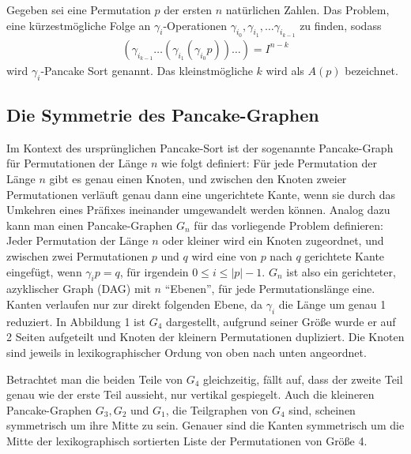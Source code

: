 \documentclass[a4paper, 10pt, ngerman]{article}
\begin{document}
\begin{definition}
    Gegeben sei eine Permutation $p$ der ersten $n$ natürlichen Zahlen. Das Problem, eine kürzestmögliche Folge an $\gamma_i$-Operationen $\gamma_{i_0}, \gamma_{i_1}, \dots \gamma_{i_{k-1}}$ zu finden, sodass
    \begin{align*}
        (\gamma_{i_{k-1}} \dots (\gamma_{i_1} (\gamma_{i_0} p)) \dots) = I^{n - k}
    \end{align*}
    wird $\gamma_i$-Pancake Sort genannt. Das kleinstmögliche $k$ wird als $A(p)$ bezeichnet.
\end{definition}

\subsection{Die Symmetrie des Pancake-Graphen}

Im Kontext des ursprünglichen Pancake-Sort ist der sogenannte Pancake-Graph für Permutationen der Länge $n$ wie folgt definiert: Für jede Permutation der Länge $n$ gibt es genau einen Knoten, und zwischen den Knoten zweier Permutationen verläuft genau dann eine ungerichtete Kante, wenn sie durch das Umkehren eines Präfixes ineinander umgewandelt werden können. Analog dazu kann man einen Pancake-Graphen $G_n$ für das vorliegende Problem definieren: Jeder Permutation der Länge $n$ oder kleiner wird ein Knoten zugeordnet, und zwischen zwei Permutationen $p$ und $q$ wird eine von $p$ nach $q$ gerichtete Kante eingefügt, wenn $\gamma_i p = q$, für irgendein $0 \le i \le |p|-1$. $G_n$ ist also ein gerichteter, azyklischer Graph (DAG) mit $n$ ``Ebenen'', für jede Permutationslänge eine. Kanten verlaufen nur zur direkt folgenden Ebene, da $\gamma_i$ die Länge um genau 1 reduziert. In Abbildung 1 ist $G_4$ dargestellt, aufgrund seiner Größe wurde er auf 2 Seiten aufgeteilt und Knoten der kleinern Permutationen dupliziert. Die Knoten sind jeweils in lexikographischer Ordung von oben nach unten angeordnet.

Betrachtet man die beiden Teile von $G_4$ gleichzeitig, fällt auf, dass der zweite Teil genau wie der erste Teil aussieht, nur vertikal gespiegelt. Auch die kleineren Pancake-Graphen $G_3, G_2$ und $G_1$, die Teilgraphen von $G_4$ sind, scheinen symmetrisch um ihre Mitte zu sein. Genauer sind die Kanten symmetrisch um die Mitte der lexikographisch sortierten Liste der Permutationen von Größe 4.
\end{document}
